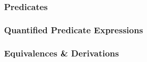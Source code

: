 \documentclass[english, 11pt]{article}
\begin{document}
\subsubsection{Predicates}
\subsubsection{Quantified Predicate Expressions}
\subsubsection{Equivalences \& Derivations}











  
\end{document}
